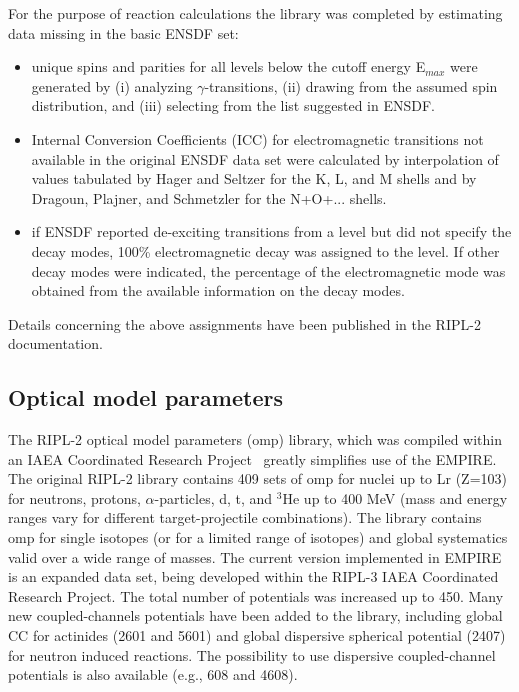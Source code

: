 \documentclass[twocolumn,amsmath,amssymb,10pt,groupedaddress,letter]{revtex4}
\begin{document}
For the purpose of reaction calculations the library was completed
by estimating data missing in the basic ENSDF set:
\begin{itemize}
\item unique spins and parities for all levels below the cutoff energy E$_{{max}}$
were generated by (i) analyzing $\gamma$-transitions, (ii)
drawing from the assumed spin distribution, and (iii) selecting
from the list suggested in ENSDF.
\item Internal Conversion Coefficients (ICC) for electromagnetic transitions
not available in the original ENSDF data set were calculated by
interpolation of values tabulated
by Hager and Seltzer for the K, L, and M shells and by Dragoun, Plajner,
and Schmetzler for the N+O+... shells.
\item if ENSDF reported de-exciting transitions from a level but did not
specify the decay modes, 100\% electromagnetic decay was assigned
to the level. If other decay modes were indicated, the percentage
of the electromagnetic mode was obtained from the available information
on the decay modes.
\end{itemize}
Details concerning the above assignments have been published in the
RIPL-2 documentation.

\subsection{Optical model parameters\label{sec:RIPLomp}}
The RIPL-2 optical model parameters
(omp) library, which was compiled within an IAEA Coordinated Research
Project~\cite{RIPL2} greatly simplifies use of the EMPIRE. The original RIPL-2
library contains 409 sets of omp for nuclei
up to Lr (Z=103) for neutrons, protons, $\alpha$-particles, d, t,
and $^{3}$He up to 400 MeV (mass and energy ranges vary for different
target-projectile combinations). The library contains omp for single
isotopes (or for a limited range of isotopes) and global systematics
valid over a wide range of masses. The current version implemented in EMPIRE
is an expanded data set, being developed within the RIPL-3
IAEA Coordinated Research Project. The total number of potentials was
increased up to 450. Many new coupled-channels potentials have been added
to the library, including global CC for actinides (2601 and 5601) and
global dispersive spherical potential (2407) for neutron induced reactions.
The possibility to use dispersive coupled-channel potentials is also available
(e.g., 608 and 4608).
\end{document}
